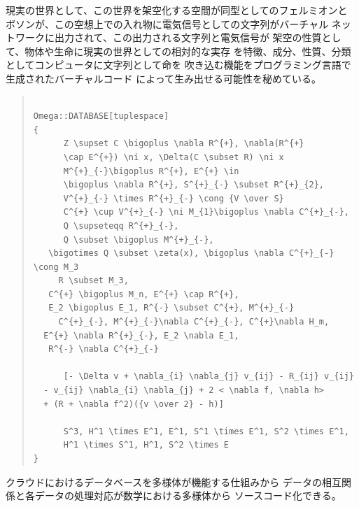 \documentclass{jsarticle}
\begin{document}
  現実の世界として、この世界を架空化する空間が同型としてのフェルミオンと
  ボソンが、この空想上での入れ物に電気信号としての文字列がバーチャル
  ネットワークに出力されて、この出力される文字列と電気信号が
  架空の性質として、物体や生命に現実の世界としての相対的な実存
  を特徴、成分、性質、分類としてコンピュータに文字列として命を
  吹き込む機能をプログラミング言語で生成されたバーチャルコード
  によって生み出せる可能性を秘めている。　

\begin{quote}
\setlength{\baselineskip}{12pt}
\begin{verbatim}

Omega::DATABASE[tuplespace]
{
      Z \supset C \bigoplus \nabla R^{+}, \nabla(R^{+} 
      \cap E^{+}) \ni x, \Delta(C \subset R) \ni x   
      M^{+}_{-}\bigoplus R^{+}, E^{+} \in 
      \bigoplus \nabla R^{+}, S^{+}_{-} \subset R^{+}_{2}, 
      V^{+}_{-} \times R^{+}_{-} \cong {V \over S}   
      C^{+} \cup V^{+}_{-} \ni M_{1}\bigoplus \nabla C^{+}_{-}, 
      Q \supseteqq R^{+}_{-}, 
      Q \subset \bigoplus M^{+}_{-}, 
   \bigotimes Q \subset \zeta(x), \bigoplus \nabla C^{+}_{-} \cong M_3   
     R \subset M_3,
   C^{+} \bigoplus M_n, E^{+} \cap R^{+},
   E_2 \bigoplus E_1, R^{-} \subset C^{+}, M^{+}_{-}   
     C^{+}_{-}, M^{+}_{-}\nabla C^{+}_{-}, C^{+}\nabla H_m,
  E^{+} \nabla R^{+}_{-}, E_2 \nabla E_1, 
   R^{-} \nabla C^{+}_{-}   

      [- \Delta v + \nabla_{i} \nabla_{j} v_{ij} - R_{ij} v_{ij} 
  - v_{ij} \nabla_{i} \nabla_{j} + 2 < \nabla f, \nabla h> 
  + (R + \nabla f^2)({v \over 2} - h)]    

      S^3, H^1 \times E^1, E^1, S^1 \times E^1, S^2 \times E^1, 
      H^1 \times S^1, H^1, S^2 \times E
}

\end{verbatim}
\end{quote}

 クラウドにおけるデータベースを多様体が機能する仕組みから
 データの相互関係と各データの処理対応が数学における多様体から
 ソースコード化できる。
\end{document}
